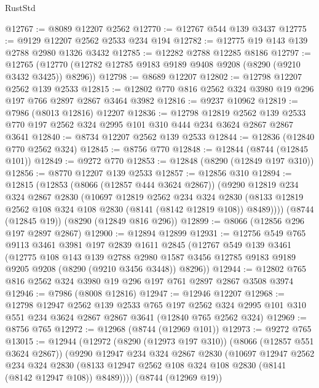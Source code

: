 \begin{lexlean}{RustStd}
\begin{coremodule}
@12767 := @8089 @12207 @2562
@12770 := @12767 @544 @139 @3437
@12775 := @9129 @12207 @2562 @2533 @234 @194
@12782 := @12775 @19 @143 @139 @2788 @2980 @1326 @3432
@12785 := @12282 @2788 @12285 @8186
@12797 := @12765 (@12770 (@12782 @12785 @9183 @9189 @9408 @9208 (@8290 (@9210 @3432 @3425)) @8296))
@12798 := @8689 @12207
@12802 := @12798 @12207 @2562 @139 @2533
@12815 := @12802 @770 @816 @2562 @324 @3980 @19 @296 @197 @766 @2897 @2867 @3464 @3982
@12816 := @9237 @10962
@12819 := @7986 (@8013 @12816) @12207
@12836 := @12798
    @12819
    @2562
    @139
    @2533
    @770
    @197
    @2562
    @324
    @2995
    @101
    @310
    @444
    @234
    @3624
    @2867
    @2867
    @3641
@12840 := @8734 @12207 @2562 @139 @2533
@12844 := @12836 (@12840 @770 @2562 @324)
@12845 := @8756 @770
@12848 := @12844 (@8744 (@12845 @101))
@12849 := @9272 @770
@12853 := @12848 (@8290 (@12849 @197 @310))
@12856 := @8770 @12207 @139 @2533
@12857 := @12856 @310
@12894 := @12815
    (@12853
      (@8066 (@12857 @444 @3624 @2867))
      (@9290
        @12819
        @234
        @324
        @2867
        @2830
        (@10697
          @12819
          @2562
          @234
          @324
          @2830
          (@8133 @12819 @2562 @108 @324 @108 @2830 (@8141 (@8142 @12819 @108)) @8489))))
    (@8744 (@12845 @19))
    (@8290 (@12849 @816 @296))
@12899 := @8066 (@12856 @296 @197 @2897 @2867)
@12900 := @12894 @12899
@12931 := @12756
    @549
    @765
    @9113
    @3461
    @3981
    @197
    @2839
    @1611
    @2845
    (@12767
      @549
      @139
      @3461
      (@12775
        @108
        @143
        @139
        @2788
        @2980
        @1587
        @3456
        @12785
        @9183
        @9189
        @9205
        @9208
        (@8290 (@9210 @3456 @3448))
        @8296))
@12944 := @12802 @765 @816 @2562 @324 @3980 @19 @296 @197 @761 @2897 @2867 @3508 @3974
@12946 := @7986 (@8008 @12816)
@12947 := @12946 @12207
@12968 := @12798
    @12947
    @2562
    @139
    @2533
    @765
    @197
    @2562
    @324
    @2995
    @101
    @310
    @551
    @234
    @3624
    @2867
    @2867
    @3641
    (@12840 @765 @2562 @324)
@12969 := @8756 @765
@12972 := @12968 (@8744 (@12969 @101))
@12973 := @9272 @765
@13015 := @12944
    (@12972
      (@8290 (@12973 @197 @310))
      (@8066 (@12857 @551 @3624 @2867))
      (@9290
        @12947
        @234
        @324
        @2867
        @2830
        (@10697
          @12947
          @2562
          @234
          @324
          @2830
          (@8133 @12947 @2562 @108 @324 @108 @2830 (@8141 (@8142 @12947 @108)) @8489))))
    (@8744 (@12969 @19))

\end{coremodule}
\end{lexlean}
